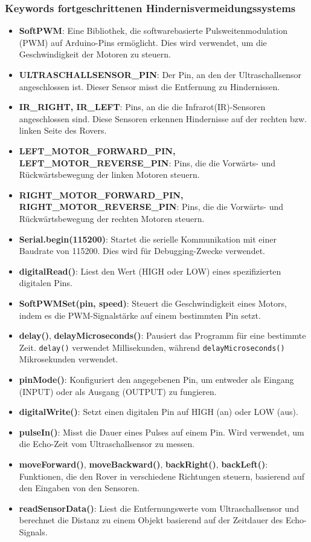 \documentclass{vorlage-design-main}
\begin{document}
\hypertarget{keywords-fortgeschrittenen-hindernisvermeidungssystems}{%
\subsubsection{Keywords fortgeschrittenen
Hindernisvermeidungssystems}\label{keywords-fortgeschrittenen-hindernisvermeidungssystems}}

\begin{itemize}
\item
  \textbf{SoftPWM}: Eine Bibliothek, die softwarebasierte
  Pulsweitenmodulation (PWM) auf Arduino-Pins ermöglicht. Dies wird
  verwendet, um die Geschwindigkeit der Motoren zu steuern.
\item
  \textbf{ULTRASCHALLSENSOR\_PIN}: Der Pin, an den der Ultraschallsensor
  angeschlossen ist. Dieser Sensor misst die Entfernung zu Hindernissen.
\item
  \textbf{IR\_RIGHT, IR\_LEFT}: Pins, an die die Infrarot(IR)-Sensoren
  angeschlossen sind. Diese Sensoren erkennen Hindernisse auf der
  rechten bzw. linken Seite des Rovers.
\item
  \textbf{LEFT\_MOTOR\_FORWARD\_PIN, LEFT\_MOTOR\_REVERSE\_PIN}: Pins,
  die die Vorwärts- und Rückwärtsbewegung der linken Motoren steuern.
\item
  \textbf{RIGHT\_MOTOR\_FORWARD\_PIN, RIGHT\_MOTOR\_REVERSE\_PIN}: Pins,
  die die Vorwärts- und Rückwärtsbewegung der rechten Motoren steuern.
\item
  \textbf{Serial.begin(115200)}: Startet die serielle Kommunikation mit
  einer Baudrate von 115200. Dies wird für Debugging-Zwecke verwendet.
\item
  \textbf{digitalRead()}: Liest den Wert (HIGH oder LOW) eines
  spezifizierten digitalen Pins.
\item
  \textbf{SoftPWMSet(pin, speed)}: Steuert die Geschwindigkeit eines
  Motors, indem es die PWM-Signalstärke auf einem bestimmten Pin setzt.
\item
  \textbf{delay()}, \textbf{delayMicroseconds()}: Pausiert das Programm
  für eine bestimmte Zeit. \verb|delay()| verwendet
  Millisekunden, während \verb|delayMicroseconds()|
  Mikrosekunden verwendet.
\item
  \textbf{pinMode()}: Konfiguriert den angegebenen Pin, um entweder als
  Eingang (INPUT) oder als Ausgang (OUTPUT) zu fungieren.
\item
  \textbf{digitalWrite()}: Setzt einen digitalen Pin auf HIGH (an) oder
  LOW (aus).
\item
  \textbf{pulseIn()}: Misst die Dauer eines Pulses auf einem Pin. Wird
  verwendet, um die Echo-Zeit vom Ultraschallsensor zu messen.
\item
  \textbf{moveForward()}, \textbf{moveBackward()}, \textbf{backRight()},
  \textbf{backLeft()}: Funktionen, die den Rover in verschiedene
  Richtungen steuern, basierend auf den Eingaben von den Sensoren.
\item
  \textbf{readSensorData()}: Liest die Entfernungswerte vom
  Ultraschallsensor und berechnet die Distanz zu einem Objekt basierend
  auf der Zeitdauer des Echo-Signals.
\end{itemize}
\end{document}
